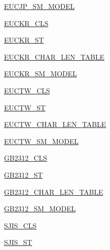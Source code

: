 \begin{DoxyCompactItemize}
\item 
\hyperlink{namespacepip_1_1__vendor_1_1chardet_1_1mbcssm_a34121c9d9e15a20b90b1aad601c77fbd}{E\+U\+C\+J\+P\+\_\+\+S\+M\+\_\+\+M\+O\+D\+EL}
\item 
\hyperlink{namespacepip_1_1__vendor_1_1chardet_1_1mbcssm_a22f8210f11bfdfbfda804b18c530a5ad}{E\+U\+C\+K\+R\+\_\+\+C\+LS}
\item 
\hyperlink{namespacepip_1_1__vendor_1_1chardet_1_1mbcssm_a6fbf150a3b8e947930d3827ffc4ac958}{E\+U\+C\+K\+R\+\_\+\+ST}
\item 
\hyperlink{namespacepip_1_1__vendor_1_1chardet_1_1mbcssm_afed460288891d23ae6b804c8370cd1c3}{E\+U\+C\+K\+R\+\_\+\+C\+H\+A\+R\+\_\+\+L\+E\+N\+\_\+\+T\+A\+B\+LE}
\item 
\hyperlink{namespacepip_1_1__vendor_1_1chardet_1_1mbcssm_a64ac73304a3c762d93666aabff62c6b8}{E\+U\+C\+K\+R\+\_\+\+S\+M\+\_\+\+M\+O\+D\+EL}
\item 
\hyperlink{namespacepip_1_1__vendor_1_1chardet_1_1mbcssm_abdff88259e0d10478e1ec4b45eea4870}{E\+U\+C\+T\+W\+\_\+\+C\+LS}
\item 
\hyperlink{namespacepip_1_1__vendor_1_1chardet_1_1mbcssm_aa7a507562ef089a349ccc4b02c3b0076}{E\+U\+C\+T\+W\+\_\+\+ST}
\item 
\hyperlink{namespacepip_1_1__vendor_1_1chardet_1_1mbcssm_a8b075be07ec46ddd760d84a43a066c3a}{E\+U\+C\+T\+W\+\_\+\+C\+H\+A\+R\+\_\+\+L\+E\+N\+\_\+\+T\+A\+B\+LE}
\item 
\hyperlink{namespacepip_1_1__vendor_1_1chardet_1_1mbcssm_a3eb10baea2e82426b06ffdef1d78fba7}{E\+U\+C\+T\+W\+\_\+\+S\+M\+\_\+\+M\+O\+D\+EL}
\item 
\hyperlink{namespacepip_1_1__vendor_1_1chardet_1_1mbcssm_a52fe9327b30fc9497df64cfb10ba4322}{G\+B2312\+\_\+\+C\+LS}
\item 
\hyperlink{namespacepip_1_1__vendor_1_1chardet_1_1mbcssm_ad88d4f726ce44bfe634df35814e726cc}{G\+B2312\+\_\+\+ST}
\item 
\hyperlink{namespacepip_1_1__vendor_1_1chardet_1_1mbcssm_ada13225236cb482aa213442f34b8d235}{G\+B2312\+\_\+\+C\+H\+A\+R\+\_\+\+L\+E\+N\+\_\+\+T\+A\+B\+LE}
\item 
\hyperlink{namespacepip_1_1__vendor_1_1chardet_1_1mbcssm_a17337a6249375c002dd149310bac2b06}{G\+B2312\+\_\+\+S\+M\+\_\+\+M\+O\+D\+EL}
\item 
\hyperlink{namespacepip_1_1__vendor_1_1chardet_1_1mbcssm_a1205a948ec200a50d6e12e5165c7ad6a}{S\+J\+I\+S\+\_\+\+C\+LS}
\item 
\hyperlink{namespacepip_1_1__vendor_1_1chardet_1_1mbcssm_a019d0aa770511719631fd5b8dd32ee44}{S\+J\+I\+S\+\_\+\+ST}

\end{DoxyCompactItemize}
